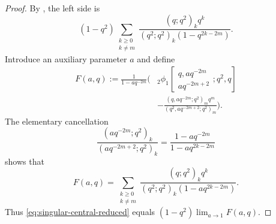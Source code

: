 \documentclass[11pt,oneside,openany]{book}
\theoremstyle{definition}
\theoremstyle{remark}
\begin{document}
\begin{proof}
By , the left side is
\[
 (1-q^2)
 \sum_{\substack{k\ge0\\k\ne m}}
 \frac{(q;q^2)_kq^k}
 {(q^2;q^2)_k(1-q^{2k-2m})}.
 \tag{18.7}\label{eq:singular-central-reduced}
\]
Introduce an auxiliary parameter $a$ and define
\begin{equation}
\begin{aligned}
 F(a,q)
 :=\frac1{1-aq^{-2m}}\Bigg(&
 {}_2\phi_1\!\left[
 \begin{matrix}q,aq^{-2m}\\aq^{-2m+2}\end{matrix};q^2,q\right]\\
 &-\frac{(q,aq^{-2m};q^2)_m q^m}
 {(q^2,aq^{-2m+2};q^2)_m}
 \Bigg).
\end{aligned}
 \tag{18.8}\label{eq:F-auxiliary}
\end{equation}
The elementary cancellation
\[
 \frac{(aq^{-2m};q^2)_k}
      {(aq^{-2m+2};q^2)_k}
 =\frac{1-aq^{-2m}}{1-aq^{2k-2m}}
\]
shows that
\[
 F(a,q)=
 \sum_{\substack{k\ge0\\k\ne m}}
 \frac{(q;q^2)_kq^k}
 {(q^2;q^2)_k(1-aq^{2k-2m})}.
 \tag{18.9}\label{eq:F-series}
\]
Thus \eqref{eq:singular-central-reduced} equals
$(1-q^2)\lim_{a\to1}F(a,q)$.


\end{proof}
\end{document}
